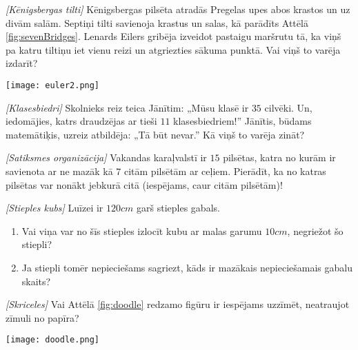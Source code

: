 






\noindent 

\begin{problem}
\textit{[Kēnigsbergas tilti]}
Kēnigsbergas pilsēta atradās Pregelas upes abos krastos un uz divām salām. Septiņi tilti savienoja krastus un salas, kā parādīts Attēlā \ref{fig:sevenBridges}. Lenards Eilers gribēja izveidot pastaigu maršrutu tā, ka viņš pa katru tiltiņu iet vienu reizi un atgriezties sākuma punktā. Vai viņš to varēja izdarīt?

\begin{center}
\texttt{[image: euler2.png]}
\label{fig:sevenBridges}
\end{center} 
\end{problem}
%

\begin{problem}
\textit{[Klasesbiedri]}
Skolnieks reiz teica Jānītim: „Mūsu klasē ir $35$ cilvēki. Un, iedomājies, katrs draudzējas  ar tieši $11$ klasesbiedriem!”
Jānītis, būdams matemātiķis, uzreiz atbildēja: „Tā būt nevar.” 
Kā viņš to varēja zināt?
\end{problem}
%

\begin{problem}
\textit{[Satiksmes organizācija]}
Vakandas karaļvalstī ir $15$ pilsētas, katra no kurām ir savienota ar ne mazāk kā $7$ citām pilsētām ar ceļiem. Pierādīt, ka no katras pilsētas var nonākt jebkurā citā (iespējams, caur citām pilsētām)!
\end{problem}
%

\begin{problem}
\textit{[Stieples kubs]}
Luīzei ir $120cm$ garš stieples gabals.
\begin{enumerate}
\item Vai viņa var no šīs stieples izlocīt kubu ar malas garumu $10cm$, negriežot šo stiepli?
\item Ja stiepli tomēr nepieciešams sagriezt, kāds ir mazākais nepieciešamais gabalu skaits?
\end{enumerate}
\end{problem}
%

\begin{problem}
\textit{[Skriceles]}
Vai Attēlā \ref{fig:doodle} redzamo figūru ir iespējams uzzīmēt, neatraujot zīmuli no papīra?
\begin{center}
\texttt{[image: doodle.png]}
\label{fig:doodle}
\end{center} 
\end{problem}
%

